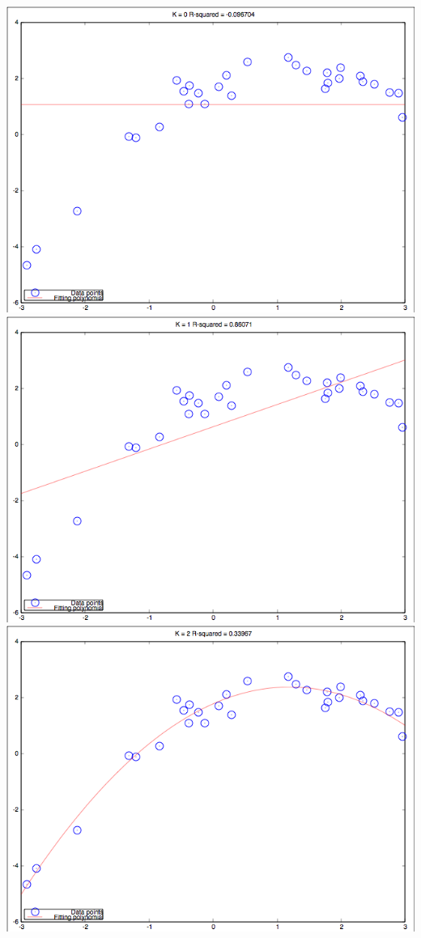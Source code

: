 \documentclass[10pt]{article}
\begin{document}
\begin{itemize}
  \includegraphics[width=\textwidth,height=\textheight,keepaspectratio]{K0}
  \includegraphics[width=\textwidth,height=\textheight,keepaspectratio]{K1}
  \includegraphics[width=\textwidth,height=\textheight,keepaspectratio]{K2}

\end{itemize}
\end{document}

